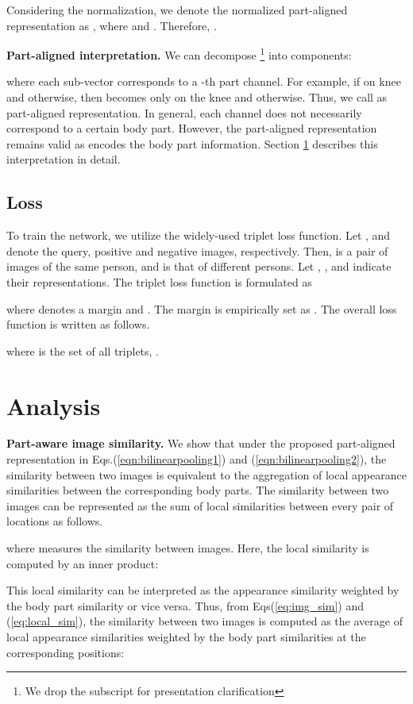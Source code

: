 \documentclass{llncs}
\begin{document}
Considering the normalization, we denote the normalized part-aligned representation as
, where  and  {\color{black}. Therefore, .}

\vspace{.1cm}
\noindent\textbf{Part-aligned interpretation.}
We can decompose \footnote{We drop the subscript 
for presentation clarification}
into  components:

where each sub-vector  corresponds to a -th part channel. For example, if  on knee and  otherwise, then  becomes  only on the knee and  otherwise. Thus, we call  as part-aligned representation. In general, each channel  does not necessarily correspond to a certain body part. However, the part-aligned representation remains valid as  encodes the body part information. Section {\ref{section:analysis}} describes this interpretation in detail.



\subsection{Loss}
To train the network, we utilize the widely-used triplet loss function.
Let ,  and  denote the query, positive and negative images, respectively. Then,  is a pair of images of the same person, and  is that of different persons.
Let , , and  indicate their representations. The triplet loss function is formulated as

where  denotes a margin and
. 
The margin is empirically set as
.
The overall loss function is written as follows.

where  is the set
of all triplets, .


\section{Analysis}
\label{section:analysis}

\noindent\textbf{Part-aware image similarity.}
We show that under the proposed part-aligned representation in Eqs.(\ref{eqn:bilinearpooling1}) and (\ref{eqn:bilinearpooling2}), the similarity between two images is equivalent to the aggregation of local appearance similarities between the corresponding body parts. 
The similarity between two images can be represented as the sum of local similarities between every pair of locations as follows.

where  measures the similarity between images.
Here, the local similarity is computed by an inner product:

This local similarity can be interpreted as the appearance similarity weighted by the body part similarity or vice versa.
Thus, from Eqs(\ref{eq:img_sim}) and (\ref{eq:local_sim}), the similarity between two images is computed as the average of local appearance similarities weighted by the body part similarities at the corresponding positions:
\end{document}
